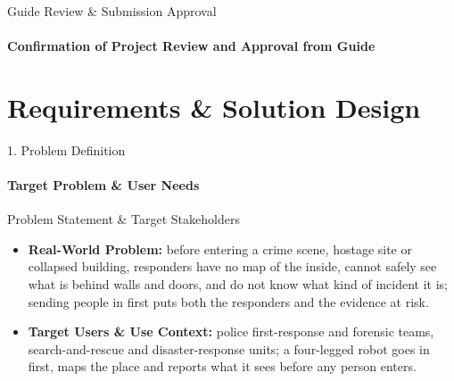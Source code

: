 \documentclass[aspectratio=169, 11pt]{beamer}
\begin{document}
\begin{frame}{Guide Review \& Submission Approval}
    \framesubtitle{Confirmation of Project Review and Approval from Guide}
    \centering
\end{frame}

\section{Requirements \& Solution Design}

\begin{frame}{1. Problem Definition }
    \framesubtitle{Target Problem \& User Needs}
    \begin{block}{Problem Statement \& Target Stakeholders}
        \small
        \begin{itemize}
            \item \textbf{Real-World Problem:} before entering a crime scene, hostage site or collapsed building, responders have no map of the inside, cannot safely see what is behind walls and doors, and do not know what kind of incident it is; sending people in first puts both the responders and the evidence at risk.
            \item \textbf{Target Users \& Use Context:} police first-response and forensic teams, search-and-rescue and disaster-response units; a four-legged robot goes in first, maps the place and reports what it sees before any person enters.
        \end{itemize}
    \end{block}
\end{frame}
\end{document}
